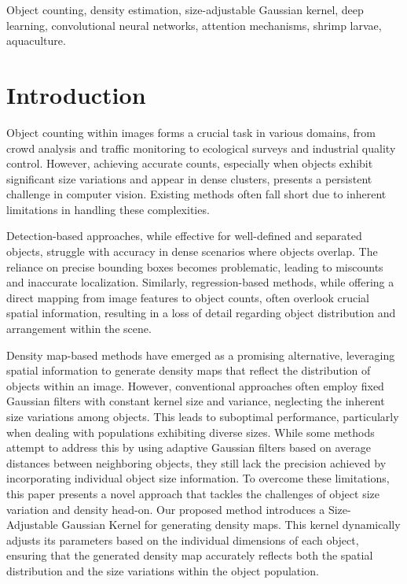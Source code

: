 \documentclass[journal]{IEEEtran}
\begin{document}
\begin{IEEEkeywords}
        Object counting, density estimation, size-adjustable Gaussian kernel, deep learning, convolutional neural networks, attention mechanisms, shrimp larvae, aquaculture.
\end{IEEEkeywords}

\section{Introduction}
Object counting within images forms a crucial task in various domains, from crowd analysis and traffic monitoring to ecological surveys and industrial quality control. However, achieving accurate counts, especially when objects exhibit significant size variations and appear in dense clusters, presents a persistent challenge in computer vision. Existing methods often fall short due to inherent limitations in handling these complexities.

Detection-based approaches\cite{shrimp_yolo1,shrimp_yolo2,yolo3, det1, shrimp_det2, shrimp_rcnn1,shrimp_rcnn2,rcnn3}, while effective for well-defined and separated objects, struggle with accuracy in dense scenarios where objects overlap. The reliance on precise bounding boxes becomes problematic, leading to miscounts and inaccurate localization. Similarly, regression-based methods\cite{shrimp_seg1,shrimp_seg2,shrimp_seg3,shrimp_seg4,shrimp_seg5,shrimp_seg6}, while offering a direct mapping from image features to object counts, often overlook crucial spatial information, resulting in a loss of detail regarding object distribution and arrangement within the scene.

Density map-based methods have emerged as a promising alternative, leveraging spatial information to generate density maps that reflect the distribution of objects within an image. However, conventional approaches often employ fixed Gaussian filters with constant kernel size and variance, neglecting the inherent size variations among objects. This leads to suboptimal performance, particularly when dealing with populations exhibiting diverse sizes. While some methods attempt to address this by using adaptive Gaussian filters based on average distances between neighboring objects, they still lack the precision achieved by incorporating individual object size information.
To overcome these limitations, this paper presents a novel approach that tackles the challenges of object size variation and density head-on. Our proposed method introduces a Size-Adjustable Gaussian Kernel for generating density maps. This kernel dynamically adjusts its parameters based on the individual dimensions of each object, ensuring that the generated density map accurately reflects both the spatial distribution and the size variations within the object population.
\end{document}
